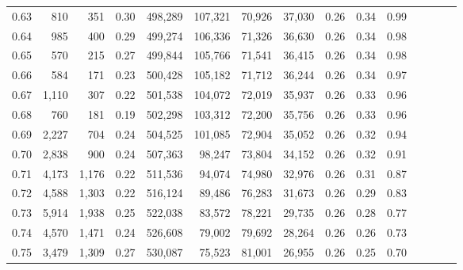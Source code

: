 \begin{tabular}{rrrcrrrrrrrrrrr}
0.63 &     810 &    351 &                                       0.30 &  498,289 &  107,321 &   70,926 &   37,030 &  0.26 &  0.34 &                         0.99 \\
0.64 &     985 &    400 &                                       0.29 &  499,274 &  106,336 &   71,326 &   36,630 &  0.26 &  0.34 &                         0.98 \\
0.65 &     570 &    215 &                                       0.27 &  499,844 &  105,766 &   71,541 &   36,415 &  0.26 &  0.34 &                         0.98 \\
0.66 &     584 &    171 &                                       0.23 &  500,428 &  105,182 &   71,712 &   36,244 &  0.26 &  0.34 &                         0.97 \\
0.67 &   1,110 &    307 &                                       0.22 &  501,538 &  104,072 &   72,019 &   35,937 &  0.26 &  0.33 &                         0.96 \\
0.68 &     760 &    181 &                                       0.19 &  502,298 &  103,312 &   72,200 &   35,756 &  0.26 &  0.33 &                         0.96 \\
0.69 &   2,227 &    704 &                                       0.24 &  504,525 &  101,085 &   72,904 &   35,052 &  0.26 &  0.32 &                         0.94 \\
0.70 &   2,838 &    900 &                                       0.24 &  507,363 &   98,247 &   73,804 &   34,152 &  0.26 &  0.32 &                         0.91 \\
0.71 &   4,173 &  1,176 &                                       0.22 &  511,536 &   94,074 &   74,980 &   32,976 &  0.26 &  0.31 &                         0.87 \\
0.72 &   4,588 &  1,303 &                                       0.22 &  516,124 &   89,486 &   76,283 &   31,673 &  0.26 &  0.29 &                         0.83 \\
0.73 &   5,914 &  1,938 &                                       0.25 &  522,038 &   83,572 &   78,221 &   29,735 &  0.26 &  0.28 &                         0.77 \\
0.74 &   4,570 &  1,471 &                                       0.24 &  526,608 &   79,002 &   79,692 &   28,264 &  0.26 &  0.26 &                         0.73 \\
0.75 &   3,479 &  1,309 &                                       0.27 &  530,087 &   75,523 &   81,001 &   26,955 &  0.26 &  0.25 &                         0.70 \\

\end{tabular}
